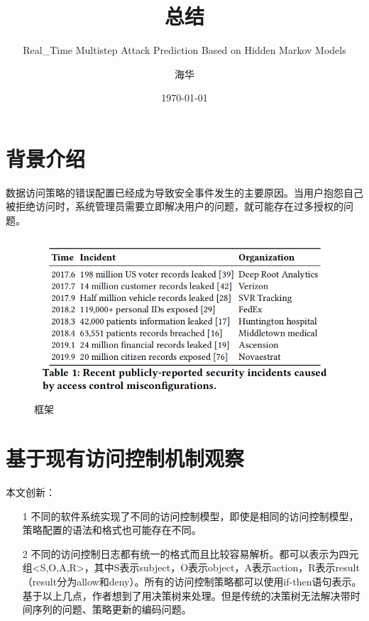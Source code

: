 \documentclass[UTF8]{ctexart}
\title{\heiti \section{总结}\label{sec:diyijie}}
\title{\heiti Real_Time Multistep Attack Prediction Based on Hidden Markov Models}
\author{\kaishu 海华}
\date{\today}
\begin{document}
    \section{背景介绍}\label{sec:diyijie}
  	数据访问策略的错误配置已经成为导致安全事件发生的主要原因。当用户抱怨自己被拒绝访问时，系统管理员需要立即解决用户的问题，就可能存在过多授权的问题。
	\begin{figure}[ht]
        \centering
        \includegraphics[scale=0.5]{picture/001.png}
        \caption{框架}
        \label{fig:001}
    \end{figure}
    \clearpage
	\section{基于现有访问控制机制观察}\label{sec:dierjie}

	本文创新：
	\begin{itemize}
	\item[1] 不同的软件系统实现了不同的访问控制模型，即使是相同的访问控制模型，策略配置的语法和格式也可能存在不同。
	\item[2] 不同的访问控制日志都有统一的格式而且比较容易解析。都可以表示为四元组<S,O,A,R>，其中S表示subject，O表示object，A表示action，R表示result（result分为allow和deny）。所有的访问控制策略都可以使用if-then语句表示。
基于以上几点，作者想到了用决策树来处理。但是传统的决策树无法解决带时间序列的问题、策略更新的编码问题。
	\end{itemize}
	\clearpage
\end{document}
